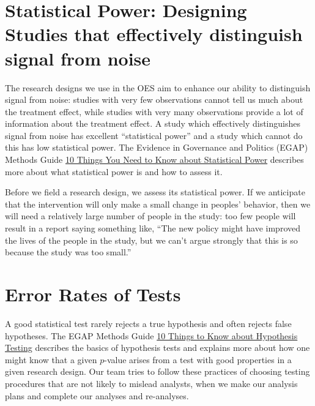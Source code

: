 \documentclass[
  12pt,
]{book}
\theoremstyle{definition}
\theoremstyle{definition}
\theoremstyle{definition}
\theoremstyle{remark}
\begin{document}
\hypertarget{statistical-power-designing-studies-that-effectively-distinguish-signal-from-noise}{%
\section{Statistical Power: Designing Studies that effectively
distinguish signal from
noise}\label{statistical-power-designing-studies-that-effectively-distinguish-signal-from-noise}}

The research designs we use in the OES aim to enhance our ability to
distinguish signal from noise: studies with very few observations cannot
tell us much about the treatment effect, while studies with very many
observations provide a lot of information about the treatment effect. A
study which effectively distinguishes signal from noise has excellent
``statistical power'' and a study which cannot do this has low
statistical power. The Evidence in Governance and Politics (EGAP)
Methods Guide
\href{https://egap.org/methods-guides/10-things-you-need-know-about-statistical-power}{10
Things You Need to Know about Statistical Power} describes more about
what statistical power is and how to assess it.

Before we field a research design, we assess its statistical power. If
we anticipate that the intervention will only make a small change in
peoples' behavior, then we will need a relatively large number of people
in the study: too few people will result in a report saying something
like, ``The new policy might have improved the lives of the people in
the study, but we can't argue strongly that this is so because the study
was too small.''

\hypertarget{error-rates-of-tests}{%
\section{Error Rates of Tests}\label{error-rates-of-tests}}

A good statistical test rarely rejects a true hypothesis and often
rejects false hypotheses. The EGAP Methods Guide
\href{https://egap.org/methods-guides/10-things-know-about-hypothesis-testing}{10
Things to Know about Hypothesis Testing} describes the basics of
hypothesis tests and explains more about how one might know that a given
\(p\)-value arises from a test with good properties in a given research
design. Our team tries to follow these practices of choosing testing
procedures that are not likely to mislead analysts, when we make our
analysis plans and complete our analyses and re-analyses.
\end{document}
